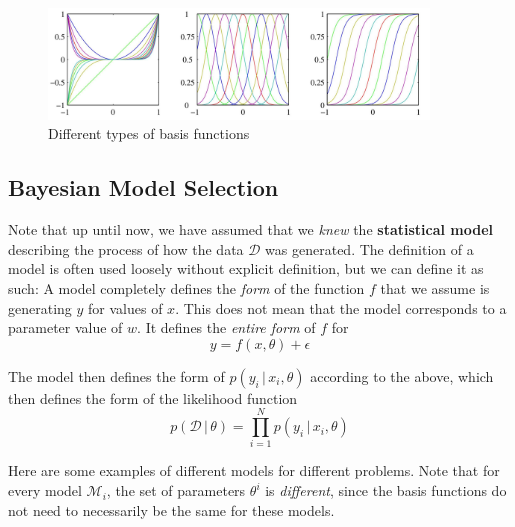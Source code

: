 \documentclass{article}
\begin{document}
    \begin{figure}[H]
      \centering
      \includegraphics[width=0.9\textwidth]{img/Linear_basis_functions.jpg}
      \caption{Different types of basis functions}
    \end{figure}

  \subsection{Bayesian Model Selection}

    Note that up until now, we have assumed that we \textit{knew} the \textbf{statistical model} describing the process of how the data $\mathcal{D}$ was generated. The definition of a model is often used loosely without explicit definition, but we can define it as such: A model completely defines the \textit{form} of the function $f$ that we assume is generating $y$ for values of $x$. This does not mean that the model corresponds to a parameter value of $w$. It defines the \textit{entire form} of $f$ for
    \begin{equation}
      y = f(x, \theta) + \epsilon
    \end{equation}

    The model then defines the form of $p(y_i\,|\,x_i, \theta)$ according to the above, which then defines the form of the likelihood function
    \begin{equation}
      p(\mathcal{D}\,|\,\theta) = \prod_{i=1}^N p(y_i\,|\,x_i, \theta)
    \end{equation}

    Here are some examples of different models for different problems. Note that for every model $\mathcal{M}_i$, the set of parameters $\theta^i$ is \textit{different}, since the basis functions do not need to necessarily be the same for these models.
\end{document}
